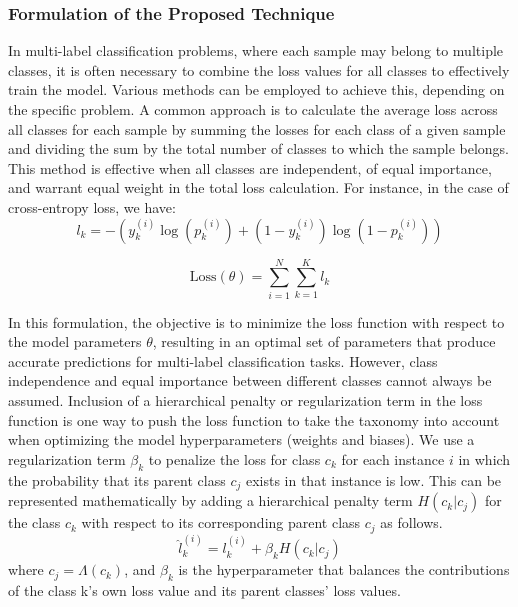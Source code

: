 \subsubsection{Formulation of the Proposed Technique}
In multi-label classification problems, where each sample may belong to multiple classes, it is often necessary to combine the loss values for all classes to effectively train the model. Various methods can be employed to achieve this, depending on the specific problem. A common approach is to calculate the average loss across all classes for each sample by summing the losses for each class of a given sample and dividing the sum by the total number of classes to which the sample belongs. This method is effective when all classes are independent, of equal importance, and warrant equal weight in the total loss calculation. For instance, in the case of cross-entropy loss, we have:
\begin{equation}
    l_k = -\left(y_k^{(i)}\log(p_k^{(i)}) + (1 - y_k^{(i)})\log(1 - p_k^{(i)})\right)
    \label{eq:taxonomy.eq.2.loss}
\end{equation}

\begin{equation}
    \text{Loss}(\theta) = \sum_{i=1}^{N}\sum_{k=1}^{K}l_k
    \label{eq:taxonomy.eq.3.totalloss}
\end{equation}

In this formulation, the objective is to minimize the loss function with respect to the model parameters $\theta $, resulting in an optimal set of parameters that produce accurate predictions for multi-label classification tasks. However, class independence and equal importance between different classes cannot always be assumed. Inclusion of a hierarchical penalty or regularization term in the loss function is one way to push the loss function to take the taxonomy into account when optimizing the model hyperparameters (weights and biases). We use a regularization term $\beta_k$  to penalize the loss for class $c_k$ for each instance $i $ in which the probability that its parent class $c_j$ exists in that instance is low. This can be represented mathematically by adding a hierarchical penalty term $H(c_k \vert c_j)$ for the class $c_k$ with respect to its corresponding parent class $c_j$ as follows.
\begin{equation}
    \widehat{l}_{k}^{(i)} = l_{k}^{(i)}+\beta_k H \left(c_k \vert c_j \right)
    \label{eq:taxonomy.eq.3.newloss}
\end{equation}
where $c_j=\Lambda(c_k)$, and $\beta_k $ is the hyperparameter that balances the contributions of the class k's own loss value and its parent classes' loss values.

